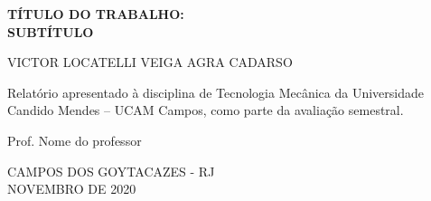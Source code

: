 \begin{titlepage}
    \begin{center}

        \uppercase{\large\textbf{título do trabalho:\\ subtítulo}}

        \vspace*{2.5cm}
        \normalsize\uppercase{
            Victor Locatelli Veiga Agra Cadarso
        }


        \vfill
        \begin{flushright}
            \begin{minipage}{8cm}
                Relatório apresentado à disciplina de Tecnologia Mecânica da Universidade Candido Mendes – UCAM Campos, como parte da avaliação semestral.
            \end{minipage}
        \end{flushright}
        \vfill
        \normalsize
        \begin{center}
            Prof. Nome do professor
        \end{center}

        \vfill

        \normalsize
        \uppercase{
            Campos dos Goytacazes - RJ
            \\
            Novembro de 2020
        }
    \end{center}
\end{titlepage}
